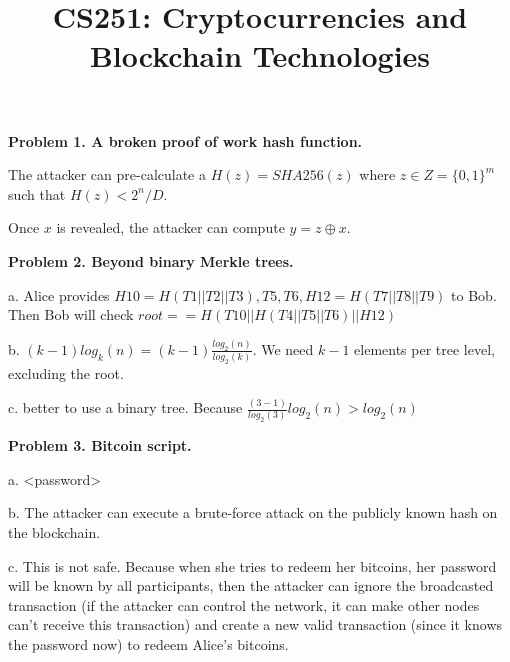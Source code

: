 \documentclass{article}
\title{CS251: Cryptocurrencies and Blockchain Technologies \exerciseset}
\begin{document}
\maketitle 


\textbf{Problem 1. A broken proof of work hash function.}

\vspace{12pt}
 
The attacker can pre-calculate a $H(z) = SHA256(z)$ where $z \in Z = \{0,1\}^m$ such that $H(z) < 2^n / D$.

\par

Once $x$ is revealed, the attacker can compute $y = z \oplus x$.

\vspace{12pt}

\textbf{Problem 2. Beyond binary Merkle trees.}

\vspace{12pt}

a. Alice provides $H10 = H(T1 || T2 || T3), T5, T6, H12 = H(T7||T8||T9)$ to Bob. 
Then Bob will check $root == H(T10 || H(T4||T5||T6) || H12)$

\vspace{6pt}

b. $(k-1) log_k(n) = (k-1) \frac{log_2(n)}{log_2(k)}$. We need $k-1$ elements per tree level, excluding the root.

\vspace{6pt}

c. better to use a binary tree. Because $\frac{(3-1)}{log_2(3)}log_2(n) > log_2(n)$

\vspace{12pt}

\textbf{Problem 3. Bitcoin script.}

\vspace{6pt}

a. <password>

\vspace{6pt}

b. The attacker can execute a brute-force attack on the publicly known hash on the blockchain.

\vspace{6pt}

c. This is not safe. Because when she tries to redeem her bitcoins, her password will be known by all participants, then the attacker can ignore the broadcasted transaction (if the attacker can control the network, it can make other nodes can't receive this transaction) and create a new valid transaction (since it knows the password now) to redeem Alice's bitcoins.
\end{document}
